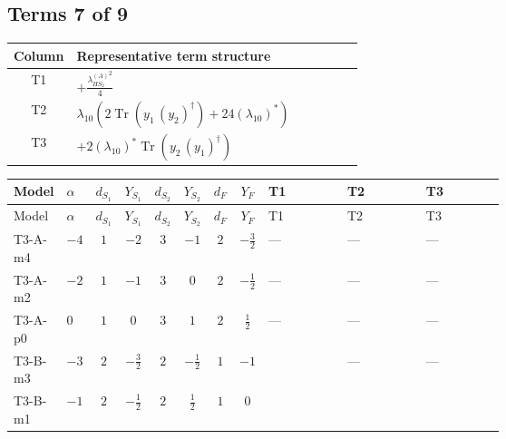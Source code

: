 \documentclass[8pt]{article}
\begin{document}
\begin{landscape}
\subsection*{Terms 7 of 9}
\begin{center}
\begin{tabular}{@{}c >{\raggedright\arraybackslash}p{0.82\linewidth}@{}}
\toprule
Column & Representative term structure \\
\midrule
T1 & \(\displaystyle +\frac{{\lambda_{HS_2}^{(A)}}^2}{4}\) \\
\midrule
T2 & \(\displaystyle {\lambda_{10}} (2 \operatorname{Tr}\!\left({y_1}\,\left({y_2}\right)^{\dagger}\right)+24 \left({\lambda_{10}}\right)^{*})\) \\
\midrule
T3 & \(\displaystyle +2 \left({\lambda_{10}}\right)^{*} \operatorname{Tr}\!\left({y_2}\,\left({y_1}\right)^{\dagger}\right)\) \\
\midrule
\bottomrule
\end{tabular}
\end{center}
\smallskip
\tiny
\begin{longtable}{@{}llcccccc >{\raggedright\arraybackslash}p{0.21\linewidth} >{\raggedright\arraybackslash}p{0.21\linewidth} >{\raggedright\arraybackslash}p{0.21\linewidth}@{}}
\toprule
Model & $\alpha$ & $d_{S_1}$ & $Y_{S_1}$ & $d_{S_2}$ & $Y_{S_2}$ & $d_F$ & $Y_F$ & T1 & T2 & T3 \\
\midrule
\endfirsthead
\toprule
Model & $\alpha$ & $d_{S_1}$ & $Y_{S_1}$ & $d_{S_2}$ & $Y_{S_2}$ & $d_F$ & $Y_F$ & T1 & T2 & T3 \\
\midrule
\endhead
T3-A-m4 & $-4$ & $1$ & $-2$ & $3$ & $-1$ & $2$ & $-\frac{3}{2}$ & --- & --- & --- \\
\midrule
T3-A-m2 & $-2$ & $1$ & $-1$ & $3$ & $0$ & $2$ & $-\frac{1}{2}$ & --- & --- & --- \\
\midrule
T3-A-p0 & $0$ & $1$ & $0$ & $3$ & $1$ & $2$ & $\frac{1}{2}$ & --- & --- & --- \\
\midrule
T3-B-m3 & $-3$ & $2$ & $-\frac{3}{2}$ & $2$ & $-\frac{1}{2}$ & $1$ & $-1$ & \scriptsize\adjustbox{max width=\linewidth}{$\begin{gathered} +\frac{{\lambda_{HS_2}^{(A)}}^2}{4}\end{gathered}$} & --- & --- \\
\midrule
T3-B-m1 & $-1$ & $2$ & $-\frac{1}{2}$ & $2$ & $\frac{1}{2}$ & $1$ & $0$ & \scriptsize\adjustbox{max width=\linewidth}{$\begin{gathered} +\frac{{\lambda_{HS_2}^{(A)}}^2}{4}\end{gathered}$} & \scriptsize\adjustbox{max width=\linewidth}{$\begin{gathered} {\lambda_{10}} (2 \operatorname{Tr}\!\left({y_1}\,\left({y_2}\right)^{\dagger}\right)+24 \left({\lambda_{10}}\right)^{*})\end{gathered}$} & \scriptsize\adjustbox{max width=\linewidth}{$\begin{gathered} +2 \left({\lambda_{10}}\right)^{*} \operatorname{Tr}\!\left({y_2}\,\left({y_1}\right)^{\dagger}\right)\end{gathered}$} \\

\end{longtable}
\end{landscape}
\end{document}
